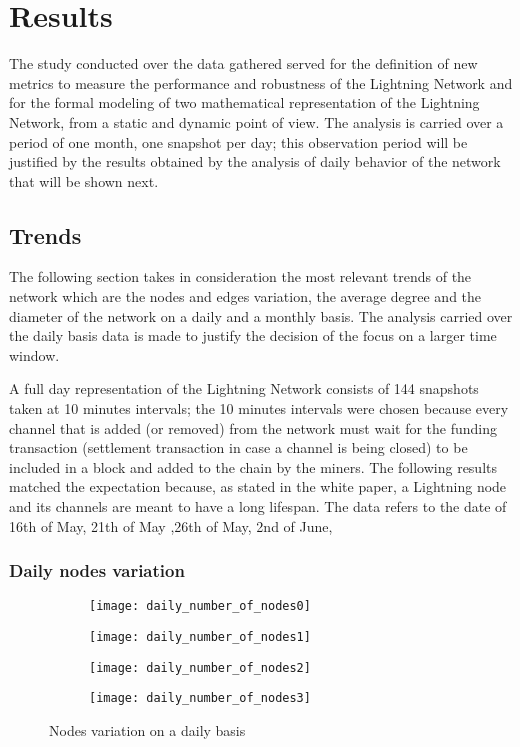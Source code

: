 
	\chapter{Results}
	
	The study conducted over the data gathered served for the definition of new metrics to measure the performance and robustness of the Lightning Network and for the formal modeling of two mathematical representation of the Lightning Network, from a static and dynamic point of view. The analysis is carried over a period of one month, one snapshot per day; this observation period will be justified by the results obtained by the analysis of daily behavior of the network that will be shown next. 
	
	\section{Trends}
	
	The following section takes in consideration the most relevant trends of the network which are the nodes and edges variation, the average degree and the diameter of the network on a daily and a monthly basis. The analysis carried over the daily basis data is made to justify the decision of the focus on a larger time window. 
	
	A full day representation of the Lightning Network consists of 144 snapshots taken at 10 minutes intervals; the 10 minutes intervals were chosen because every channel that is added (or removed) from the network must wait for the funding transaction (settlement transaction in case a channel is being closed) to be included in a block and added to the chain by the miners. The following results matched the expectation because, as stated in the white paper, a Lightning node and its channels are meant to have a long lifespan. The data refers to the date of 16th of May, 21th of May ,26th of May, 2nd of June, 
	
	\subsection{Daily nodes variation}
	
	\begin{figure}[h]
		\centering
		\begin{subfigure}{0.45\textwidth}
			\centering
			\texttt{[image: daily\_number\_of\_nodes0]}
		\end{subfigure}
		\begin{subfigure}{0.45\textwidth}
			\centering
			\texttt{[image: daily\_number\_of\_nodes1]}
		\end{subfigure}
			\begin{subfigure}{0.45\textwidth}
			\centering
			\texttt{[image: daily\_number\_of\_nodes2]}
		\end{subfigure}
		\begin{subfigure}{0.45\textwidth}
			\centering
			\texttt{[image: daily\_number\_of\_nodes3]}
		\end{subfigure}
		
		\caption{Nodes variation on a daily basis}
		\label{daily_nodes_variation}
	\end{figure}

